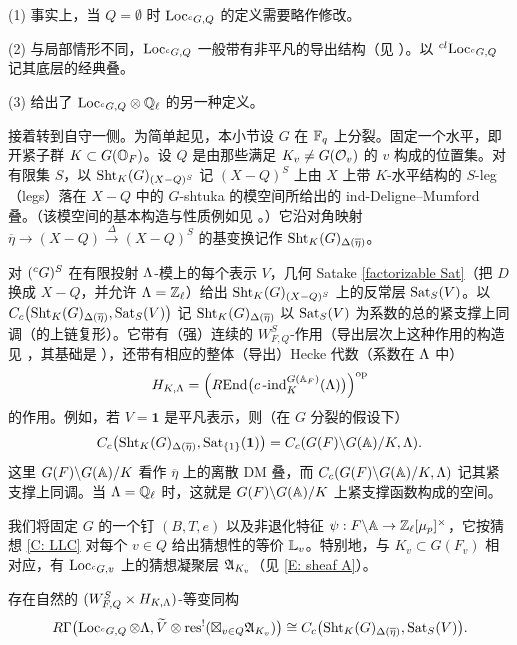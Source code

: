 \begin{rmk}
(1) 事实上，当 $Q=\emptyset$ 时 ${\operatorname{Loc}}_{{}^cG,Q}$ 的定义需要略作修改。

(2) 与局部情形不同，${\operatorname{Loc}}_{{}^cG,Q}$ 一般带有非平凡的导出结构（见 \cite[Rem. 3.4.5]{Zhu-Conjecture}）。以 ${}^{cl}{\operatorname{Loc}}_{{}^cG,Q}$ 记其底层的经典叠。

(3) \cite{AGKRRV} 给出了 ${\operatorname{Loc}}_{{}^cG,Q}\otimes{\mathbb Q}_\ell$ 的另一种定义。
\end{rmk}

接着转到自守一侧。为简单起见，本小节设 $G$ 在 ${\mathbb F}_q$ 上分裂。固定一个水平，即开紧子群 $K\subset G({\mathbb O}_F)$。设 $Q$ 是由那些满足 $K_v\neq G({\mathcal O}_v)$ 的 $v$ 构成的位置集。对有限集 $S$，以 ${\operatorname{Sht}}_K(G)_{(X-Q)^S}$ 记 $(X-Q)^S$ 上由 $X$ 上带 $K$-水平结构的 $S$-leg（legs）落在 $X-Q$ 中的 $G$-shtuka 的模空间所给出的 ind-Deligne--Mumford 叠。（该模空间的基本构造与性质例如见 \cite{Lafforgue-Automorphic-to-Galois}。）它沿对角映射 $\overline\eta\to (X-Q)\xrightarrow{\Delta}(X-Q)^S$ 的基变换记作 ${\operatorname{Sht}}_K(G)_{\Delta(\overline\eta)}$。

对 $({}^cG)^S$ 在有限投射 ${\Lambda}$-模上的每个表示 $V$，几何 Satake \eqref{factorizable Sat}（把 $D$ 换成 $X-Q$，并允许 ${\Lambda}={\mathbb Z}_\ell$）给出 ${\operatorname{Sht}}_K(G)_{(X-Q)^S}$ 上的反常层 $\operatorname{Sat}_S(V)$。以 $C_c\bigl({\operatorname{Sht}}_K(G)_{\Delta(\overline\eta)},{\operatorname{Sat}}_S(V)\bigr)$ 记 ${\operatorname{Sht}}_K(G)_{\Delta(\overline\eta)}$ 以 ${\operatorname{Sat}}_S(V)$ 为系数的总的紧支撑上同调（的上链复形）。它带有（强）连续的 $W_{F,Q}^S$-作用（导出层次上这种作用的构造见 \cite{HRS-Kunneth}，其基础是 \cite{Xue-Finiteness, Xue-Smoothness}），还带有相应的整体（导出）Hecke 代数（系数在 ${\Lambda}$ 中）
\begin{equation}\label{E: derived hecke global}
H_{K,{\Lambda}}=\Big(R{\operatorname{End}} \big(c\operatorname{-ind}_K^{G({\mathbb A}_F)}({\Lambda})\big)\Big)^{{\operatorname{op}}}
\end{equation}
的作用。例如，若 $V=\mathbf{1}$ 是平凡表示，则（在 $G$ 分裂的假设下）
\[C_c\bigl({\operatorname{Sht}}_K(G)_{\Delta(\overline\eta)}, \operatorname{Sat}_{\{1\}}(\mathbf{1})\bigr)= C_c(G(F)\backslash G({\mathbb A})/K,{\Lambda}).\]
这里 $G(F)\backslash G({\mathbb A})/K$ 看作 $\overline\eta$ 上的离散 DM 叠，而 $C_c(G(F)\backslash G({\mathbb A})/K,{\Lambda})$ 记其紧支撑上同调。当 ${\Lambda}={\mathbb Q}_\ell$ 时，这就是 $G(F)\backslash G({\mathbb A})/K$ 上紧支撑函数构成的空间。

我们将固定 $G$ 的一个钉 $(B,T,e)$ 以及非退化特征 $\psi: F\backslash {\mathbb A}\to {\mathbb Z}_\ell[\mu_{p}]^\times$，它按猜想 \ref{C: LLC} 对每个 $v\in Q$ 给出猜想性的等价 ${\mathbb L}_{v}$。特别地，与 $K_v\subset G(F_v)$ 相对应，有 ${\operatorname{Loc}}_{{}^cG,v}$ 上的猜想凝聚层 ${\mathfrak A}_{K_v}$（见 \eqref{E: sheaf A}）。

\begin{conj}\label{C: gen coh}
存在自然的 $(W_{F,Q}^S\times H_{K,{\Lambda}})$-等变同构
\[
R\Gamma\bigl(\operatorname{Loc}_{{}^cG,Q}\otimes{\Lambda}, \widetilde{V}\otimes  {\operatorname{res}}^!(\boxtimes_{v\in Q} {\mathfrak A}_{K_v})\bigr)\cong C_c\bigl(\operatorname{Sht}_K(G)_{\Delta(\overline\eta)}, \operatorname{Sat}_S(V)\bigr).
\]
\end{conj}

